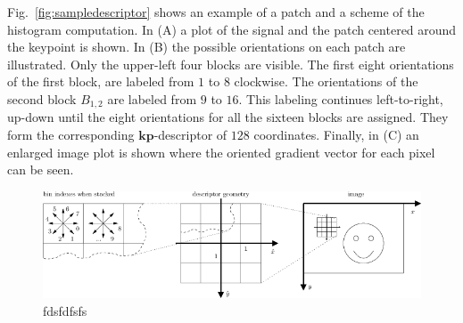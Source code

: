 Fig.~\ref{fig:sampledescriptor} shows an example of a patch and a scheme of the histogram computation. In (A) a plot of the signal and the patch centered around the keypoint is shown. In (B) the possible orientations on each patch are illustrated.  Only the upper-left four blocks are visible.  The first eight orientations of the first block, are labeled from $1$ to $8$ clockwise. The orientations of the second block $ B_{1,2} $ are labeled from $9$ to $16$.  This labeling continues left-to-right, up-down until the eight orientations for all the sixteen blocks are assigned. They form the corresponding $\mathbf{kp}$-descriptor of $128$ coordinates. Finally, in (C) an enlarged image plot is shown where the oriented gradient vector for each pixel can be seen.

\begin{figure}[h!]
\centering
\includegraphics[scale=1.2]{images/sift-conv-vlfeat.png}
\caption[SIFT Patches]{fdsfdfsfs }
\label{fig:siftpatch}
\end{figure}

